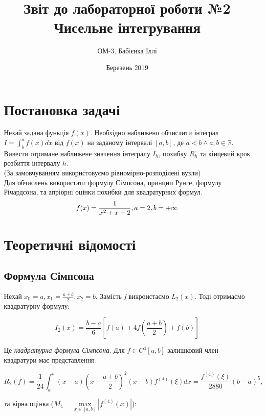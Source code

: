 \documentclass[12pt]{extarticle}
\title{Звіт до лабораторної роботи №2 \\ Чисельне інтегрування}
\author{ОМ-3, Бабієнка Іллі}
\date{Березень 2019}
\newcommand{\R}{\mathbb{R}}
\newcommand{\<}{\langle}
\renewcommand{\>}{\rangle}
\theoremstyle{definition}
\begin{document}
\maketitle

\section{Постановка задачі}

Нехай задана функція $f(x)$. Необхідно наближено обчислити інтеграл $I=\int_{b}^{a}f(x)dx$ від $f(x)$ на заданому інтервалі $[a,b]$, де $a < b \wedge a,b \in \bar{\R}$.\\
Вивести отримане наближене значення інтегралу $I_h$, похибку $R_{h}^{\circ}$ та кінцевий крок розбиття інтервалу $h$.\\
(За замовчуванням використовуємо рівномірно-розподілені вузли)\\
Для обчислень використати формулу Сімпсона, принцип Рунге, формулу Річардсона, та апріорні оцінки похибки для квадратурних формул.
\begin{equation}
	f(x) = \frac{1}{x^2+x-2}, \space a = 2, \space b = +\infty
\end{equation}

\vspace{1cm}

\section{Теоретичні відомості}
\subsection{Формула Сімпсона}

Нехай $x_{0}=a, x_{1}=\frac{a+b}{2},x_{2}=b$. Замість \textit{f} викроистаємо $L_{2}(x)$. Тоді отримаємо квадратурну формулу:

\begin{equation}
	I_{2}(x) = \frac{b-a}{6}\left[f(a)+4f(\frac{a+b}{2})+f(b) \right]
\end{equation}

Це \textit{квадратурна формула Сімпсона}.
Для $f \in C^{4}[a,b]$ залишковий член квадратури має представлення:

\begin{equation}
	R_{2}(f)=\frac{1}{24}\int_{a}^{b}(x-a)(x-\frac{a+b}{2})^{2}(x-b)f^{(4)}(\xi)dx=\frac{f^{(4)}(\xi)}{2880}(b-a)^{5},
\end{equation}

та вірна оцінка ($M_{4} = \underset{x \in [a,b]}{\max}|f^{(4)}(x)|$):
\end{document}
